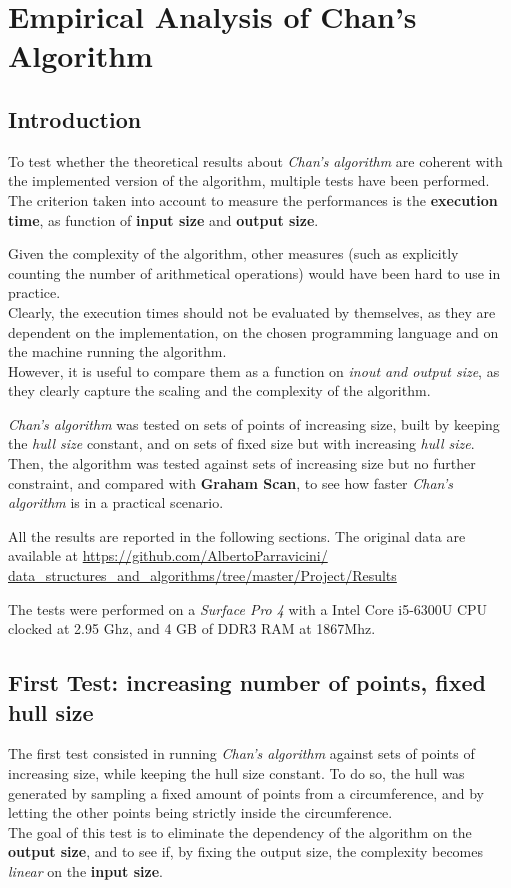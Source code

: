 \documentclass[
12pt,
a4paper,
oneside,
headinclude,
footinclude]{report}
\theoremstyle{definition} %
\begin{document}
\chapter{Empirical Analysis of Chan's Algorithm}
\section{Introduction}
To test whether the theoretical results about \textit{Chan's algorithm} are coherent with the implemented version of the algorithm, multiple tests have been performed. \\
The criterion taken into account to measure the performances is the \textbf{execution time}, as function of \textbf{input size} and \textbf{output size}.

Given the complexity of the algorithm, other measures (such as explicitly counting the number of arithmetical operations) would have been hard to use in practice.\\
Clearly, the execution times should not be evaluated by themselves, as they are dependent on the implementation, on the chosen programming language and on the machine running the algorithm.\\
However, it is useful to compare them as a function on \textit{inout and output size}, as they clearly capture the scaling and the complexity of the algorithm.

\textit{Chan's algorithm} was tested on sets of points of increasing size, built by keeping the \textit{hull size} constant, and on sets of fixed size but with increasing \textit{hull size}. \\
Then, the algorithm was tested against sets of increasing size but no further constraint, and compared with \textbf{Graham Scan}, to see how faster \textit{Chan's algorithm} is in a practical scenario.

All the results are reported in the following sections.
The original data are available at \href{https://github.com/AlbertoParravicini/data\_structures\_and\_algorithms/tree/master/Project/Results}{https://github.com/AlbertoParravicini/ \\ data\_structures\_and\_algorithms/tree/master/Project/Results}

The tests were performed on a \textit{Surface Pro 4} with a Intel Core i5-6300U  CPU clocked at 2.95 Ghz, and 4 GB of DDR3 RAM at 1867Mhz.


\section{\textbf{First Test:} increasing number of points, fixed hull size}
The first test consisted in running \textit{Chan's algorithm} against sets of points of increasing size, while keeping the hull size constant. To do so, the hull was generated by sampling a fixed amount of points from a circumference, and by letting the other points being strictly inside the circumference.\\
The goal of this test is to eliminate the dependency of the algorithm on the \textbf{output size}, and to see if, by fixing the output size, the complexity becomes \textit{linear} on the \textbf{input size}.
\end{document}
